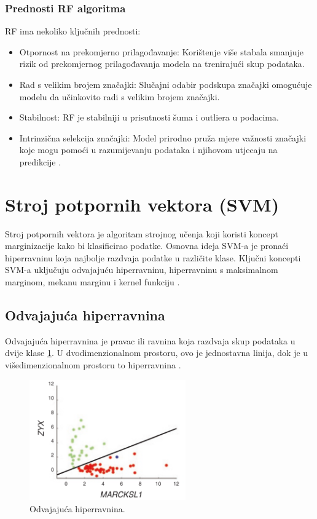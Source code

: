 \documentclass[zavrsnirad]{fer}
\begin{document}
\subsubsection{Prednosti RF algoritma}
RF ima nekoliko ključnih prednosti:
\begin{itemize}
	\item Otpornost na prekomjerno prilagođavanje: Korištenje više stabala smanjuje rizik od prekomjernog prilagođavanja modela na trenirajući skup podataka.
	\item Rad s velikim brojem značajki: Slučajni odabir podskupa značajki omogućuje modelu da učinkovito radi s velikim brojem značajki.
	\item Stabilnost: RF je stabilniji u prisutnosti šuma i outliera u podacima.
	\item Intrinzična selekcija značajki: Model prirodno pruža mjere važnosti značajki koje mogu pomoći u razumijevanju podataka i njihovom utjecaju na predikcije \cite{sarica2017}.
\end{itemize}


\section{Stroj potpornih vektora (SVM)}
Stroj potpornih vektora je algoritam strojnog učenja koji koristi koncept marginizacije kako bi klasificirao podatke. Osnovna ideja SVM-a je pronaći hiperravninu koja najbolje razdvaja podatke u različite klase. Ključni koncepti SVM-a uključuju odvajajuću hiperravninu, hiperravninu s maksimalnom marginom, mekanu marginu i kernel funkciju \cite{fletcher2009}.

\subsection{Odvajajuća hiperravnina}
Odvajajuća hiperravnina je pravac ili ravnina koja razdvaja skup podataka u dvije klase \ref{fig:odv_hiper}. U dvodimenzionalnom prostoru, ovo je jednostavna linija, dok je u višedimenzionalnom prostoru to hiperravnina \cite{Noble2006}.
\begin{figure}[h]
	\centering
	\includegraphics[width=0.6\textwidth]{Figures/odv_hiperravnina.png}
	\caption{Odvajajuća hiperravnina. \cite{Noble2006}}
	\label{fig:odv_hiper}
\end{figure}
\end{document}
